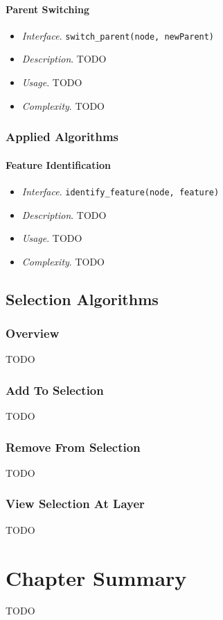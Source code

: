 \paragraph{Parent Switching}

\begin{itemize}

\item \emph{Interface}. \texttt{switch_parent(node, newParent)}

\item \emph{Description}. TODO

\item \emph{Usage}. TODO

\item \emph{Complexity}. TODO

\end{itemize}

\subsubsection{Applied Algorithms}

\paragraph{Feature Identification}

\begin{itemize}

\item \emph{Interface}. \texttt{identify_feature(node, feature)}

\item \emph{Description}. TODO

\item \emph{Usage}. TODO

\item \emph{Complexity}. TODO

\end{itemize}

\subsection{Selection Algorithms}

\subsubsection{Overview}

TODO

\subsubsection{Add To Selection}

TODO

\subsubsection{Remove From Selection}

TODO

\subsubsection{View Selection At Layer}

TODO

\section{Chapter Summary}

TODO
